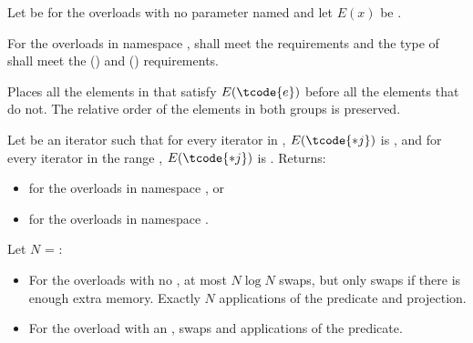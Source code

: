 \begin{itemdescr}
\pnum
Let  be 
for the overloads with no parameter named 
and let $E(x)$ be .

\requires
For the overloads in namespace ,
 shall meet
the  requirements and
the type of  shall meet
the  () and
 () requirements.

\pnum
\effects
Places all the elements  in 
that satisfy $E(\tcode{e})$ before all the elements that do not.
The relative order of the elements in both groups is preserved.

\pnum
\returns
Let  be an iterator
such that for every iterator  in ,
$E(\tcode{*j})$ is ,
and for every iterator  in the range ,
$E(\tcode{*j})$ is .
Returns:
\begin{itemize}
\item {} for the overloads in namespace , or
\item {} for the overloads in namespace .
\end{itemize}


\pnum
\complexity
Let $N$ = :
\begin{itemize}
\item
  For the overloads with no , at most $N \log N$ swaps,
  but only  swaps if there is enough extra memory.
  Exactly $N$ applications of the predicate and projection.
\item
  For the overload with an ,
   swaps and  applications of the predicate.
\end{itemize}
\end{itemdescr}

